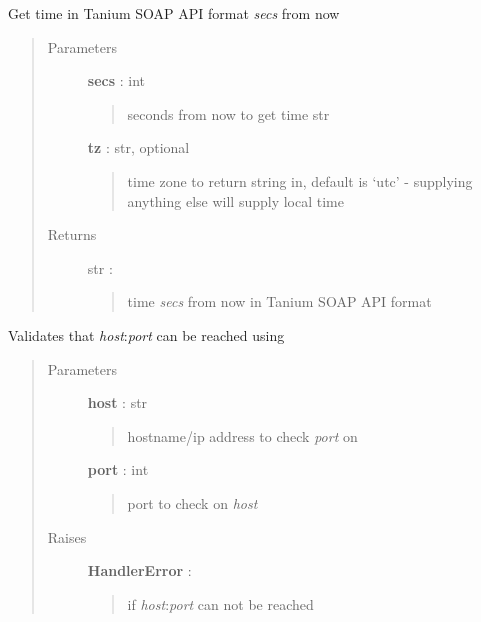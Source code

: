 \documentclass[letterpaper,10pt,english]{sphinxmanual}
\begin{document}
\begin{fulllineitems}
\label{pytan.utils:pytan.utils.seconds_from_now}
Get time in Tanium SOAP API format \emph{secs} from now
\begin{quote}\begin{description}
\item[{Parameters}] \leavevmode
\textbf{secs} : int
\begin{quote}

seconds from now to get time str
\end{quote}

\textbf{tz} : str, optional
\begin{quote}

time zone to return string in, default is `utc' - supplying anything else will supply local time
\end{quote}

\item[{Returns}] \leavevmode
str :
\begin{quote}

time \emph{secs} from now in Tanium SOAP API format
\end{quote}

\end{description}\end{quote}

\end{fulllineitems}


\begin{fulllineitems}
\label{pytan.utils:pytan.utils.test_app_port}
Validates that \emph{host}:\emph{port} can be reached using {\hyperref[pytan.utils:pytan.utils.port_check]{}}
\begin{quote}\begin{description}
\item[{Parameters}] \leavevmode
\textbf{host} : str
\begin{quote}

hostname/ip address to check \emph{port} on
\end{quote}

\textbf{port} : int
\begin{quote}

port to check on \emph{host}
\end{quote}

\item[{Raises}] \leavevmode
\textbf{HandlerError} : {\hyperref[pytan.utils:pytan.utils.HandlerError]{}}
\begin{quote}

if \emph{host}:\emph{port} can not be reached
\end{quote}

\end{description}\end{quote}

\end{fulllineitems}
\end{document}
